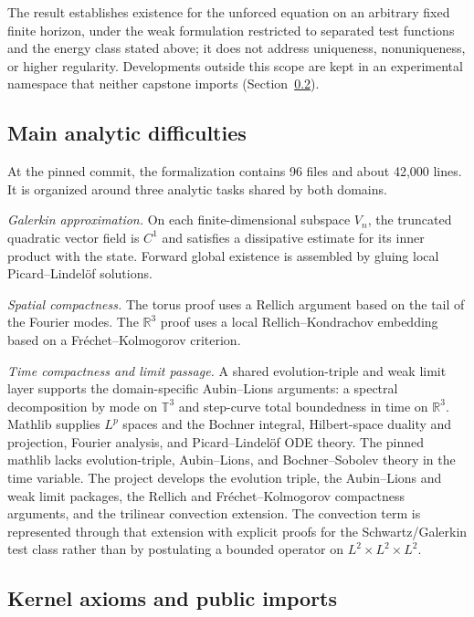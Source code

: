 The result establishes existence for the unforced equation on an arbitrary
fixed finite horizon, under the weak formulation restricted to separated
test functions and the energy class stated above; it does not address
uniqueness, nonuniqueness, or higher regularity. Developments outside this
scope are kept in an experimental namespace that neither capstone imports
(Section~\ref{sec:release-surface}).

\subsection{Main analytic difficulties}

At the pinned commit, the formalization contains 96 files and about
42,000 lines.
It is organized around three analytic tasks shared by both domains.

\emph{Galerkin approximation.}
On each finite-dimensional subspace $V_n$, the truncated quadratic
vector field is $C^1$ and satisfies a dissipative estimate for its inner
product with the state. Forward global existence is assembled by gluing local
Picard--Lindelöf solutions.

\emph{Spatial compactness.}
The torus proof uses a Rellich argument based on the tail of the Fourier
modes. The $\mathbb{R}^3$ proof uses a local Rellich--Kondrachov
embedding based on a Fréchet--Kolmogorov criterion.

\emph{Time compactness and limit passage.}
A shared evolution-triple and weak limit layer supports the
domain-specific Aubin--Lions arguments: a spectral decomposition by mode
on $\mathbb{T}^3$ and step-curve total boundedness in time on
$\mathbb{R}^3$. Mathlib supplies $L^p$ spaces and the Bochner integral,
Hilbert-space duality and projection, Fourier analysis, and
Picard--Lindel\"of ODE theory. The pinned mathlib lacks evolution-triple,
Aubin--Lions, and Bochner--Sobolev theory in the time variable. The
project develops the evolution triple, the Aubin--Lions and weak limit
packages, the Rellich and Fr\'echet--Kolmogorov compactness arguments, and
the trilinear convection extension. The convection term is represented
through that extension with explicit proofs for the Schwartz/Galerkin test
class rather than by postulating a bounded operator on
$L^2\times L^2\times L^2$.

\subsection{Kernel axioms and public imports}\label{sec:release-surface}

